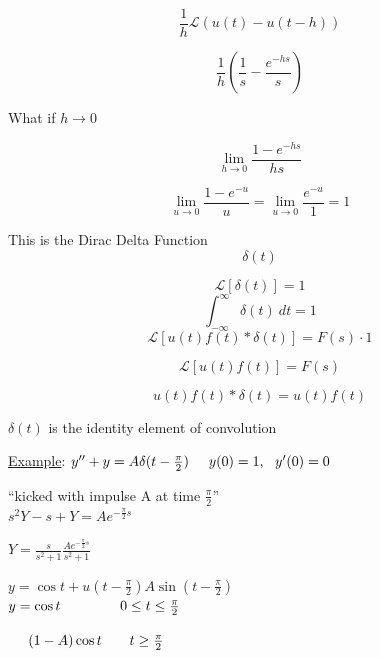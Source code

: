 \documentclass[12pt]{article}
\numberwithin{equation}{subsection}
\newcommand{\lap}{\mathscr{L}}
\newcommand{\sinp}[1]{\sin\left( #1 \right)}
\newcommand{\inda}{\hspace{.5cm}}
\newcommand{\indc}{\hspace{1.5cm}}
\newcommand{\indd}{\hspace{2cm}}
\newcommand{\exa}{\noindent \underline{Example}: \hspace{1cm}}
\begin{document}
\begin{equation}
\frac{1}{h} \lap\left( u(t)-u(t-h) \right)
\end{equation}

\begin{equation}
\frac{1}{h} \left( \frac{1}{s}-\frac{e^{-hs}}{s} \right)
\end{equation}

What if $h \rightarrow 0$

\begin{equation}
\lim_{h \rightarrow 0} \frac{1-e^{-hs}}{hs}
\end{equation}

\begin{equation}
\lim_{u \rightarrow 0} \frac{1-e^{-u}}{u} = \lim_{u \rightarrow 0} \frac{e^{-u}}{1} =1
\end{equation}

This is the Dirac Delta Function
\begin{equation}
\delta(t)
\end{equation}

\begin{equation}
\lap[\delta(t)]=1
\end{equation}
\begin{equation}
\int_{-\infty}^{\infty} \delta(t)\ dt =1
\end{equation}
$$ \lap[u(t)f(t) * \delta (t)] = F(s) \cdot 1$$

$$ \lap[u(t)f(t) ] = F(s) $$

\begin{equation}
u(t)f(t) * \delta (t) = u(t)f(t)
\end{equation}

$\delta (t)$ is the identity element of convolution

\newpage
\exa $y''+y=A\delta (t-\frac{\pi}{2})\inda   y(0)=1,\ \ y'(0)=0$

``kicked with impulse A at time $\frac{\pi}{2}$''\\

\indd $s^2Y-s+Y=Ae^{-\frac{\pi}{2}s}$

\indd $Y=\frac{s}{s^2+1} \frac{Ae^{-\frac{\pi}{2}s}}{s^2+1}$

\indd $y=\cos t + u(t-\frac{\pi}{2})A\sinp{t-\frac{\pi}{2}}$\\

$y=\cos t \indc 0 \leq t \leq \frac{\pi}{2}$

$\inda (1-A)\cos t\ \ \ \ \ \ t \geq \frac{\pi}{2} $\\
\end{document}
